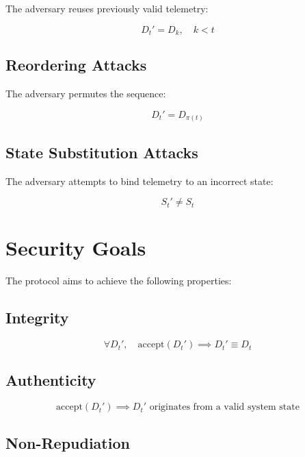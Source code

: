 The adversary reuses previously valid telemetry:

\begin{equation}
D_t' = D_k, \quad k < t
\end{equation}

\subsection{Reordering Attacks}

The adversary permutes the sequence:

\begin{equation}
D_t' = D_{\pi(t)}
\end{equation}

\subsection{State Substitution Attacks}

The adversary attempts to bind telemetry to an incorrect state:

\begin{equation}
S_t' \neq S_t
\end{equation}

\section{Security Goals}

The protocol aims to achieve the following properties:

\subsection{Integrity}

\begin{equation}
\forall D_t', \quad \text{accept}(D_t') \implies D_t' \equiv D_t
\end{equation}

\subsection{Authenticity}

\begin{equation}
\text{accept}(D_t') \implies D_t' \text{ originates from a valid system state}
\end{equation}

\subsection{Non-Repudiation}

